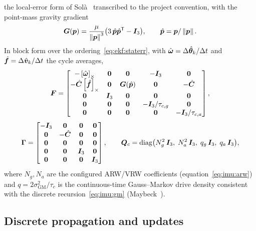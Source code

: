 the local-error form of Sol\`a~\cite{sola2017} transcribed to the
project convention, with the point-mass gravity gradient
\begin{equation}
  \bm{G}(\bm{p}) = \frac{\mu}{\left\lVert \bm{p} \right\rVert^3}
    \bigl(3\,\hat{\bm{p}}\hat{\bm{p}}^{\mathsf T} - \bm{I}_3\bigr),
  \qquad
  \hat{\bm{p}} = \bm{p}/\left\lVert \bm{p} \right\rVert .
  \label{eq:ekf:gravgrad}
\end{equation}
In block form over the ordering~\eqref{eq:ekf:staterr}, with
$\hat{\bm{\omega}} = \Delta\hat{\bm{\theta}}_k/\Delta t$ and
$\hat{\bm{f}} = \Delta\hat{\bm{v}}_k/\Delta t$ the cycle averages,
\begin{equation}
  \bm{F} =
  \begin{bmatrix}
    -\left[\hat{\bm{\omega}}\right]_{\times} & \bm{0} & \bm{0} & -\bm{I}_3 &
      \bm{0} \\
    -\hat{\bm{C}}\left[\hat{\bm{f}}\right]_{\times} & \bm{0} &
      \bm{G}(\hat{\bm{p}}) & \bm{0} & -\hat{\bm{C}} \\
    \bm{0} & \bm{I}_3 & \bm{0} & \bm{0} & \bm{0} \\
    \bm{0} & \bm{0} & \bm{0} & -\bm{I}_3/\tau_{c,g} & \bm{0} \\
    \bm{0} & \bm{0} & \bm{0} & \bm{0} & -\bm{I}_3/\tau_{c,a}
  \end{bmatrix},
  \label{eq:ekf:F}
\end{equation}
\begin{equation}
  \bm{\Gamma} =
  \begin{bmatrix}
    -\bm{I}_3 & \bm{0} & \bm{0} & \bm{0} \\
    \bm{0} & -\hat{\bm{C}} & \bm{0} & \bm{0} \\
    \bm{0} & \bm{0} & \bm{0} & \bm{0} \\
    \bm{0} & \bm{0} & \bm{I}_3 & \bm{0} \\
    \bm{0} & \bm{0} & \bm{0} & \bm{I}_3
  \end{bmatrix},
  \qquad
  \bm{Q}_c = \mathrm{diag}\bigl(
    N_g^2\,\bm{I}_3,\;
    N_a^2\,\bm{I}_3,\;
    q_g\,\bm{I}_3,\;
    q_a\,\bm{I}_3\bigr),
  \label{eq:ekf:G}
\end{equation}
where $N_g, N_a$ are the configured ARW/VRW coefficients
(equation~\eqref{eq:imu:arw}) and $q = 2\sigma_{\mathrm{GM}}^2/\tau_c$
is the continuous-time Gauss--Markov drive density consistent with the
discrete recursion~\eqref{eq:imu:gm} (Maybeck~\cite{maybeck1979}).

\subsection{Discrete propagation and updates}
\label{sec:ekf:updates}

